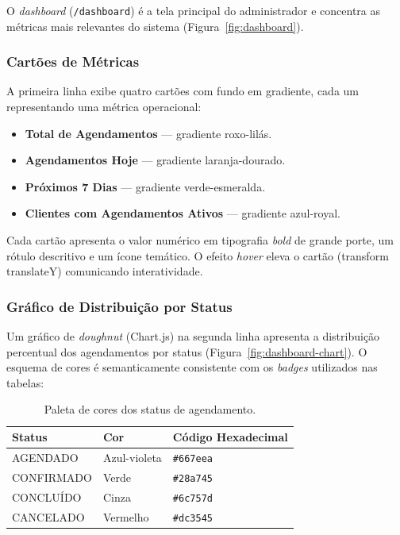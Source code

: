 O \textit{dashboard} (\texttt{/dashboard}) é a tela principal do administrador e
concentra as métricas mais relevantes do sistema
(Figura~\ref{fig:dashboard}).

\subsubsection{Cartões de Métricas}
A primeira linha exibe quatro cartões com fundo em gradiente, cada um
representando uma métrica operacional:

\begin{itemize}
  \item \textbf{Total de Agendamentos} — gradiente roxo-lilás.
  \item \textbf{Agendamentos Hoje} — gradiente laranja-dourado.
  \item \textbf{Próximos 7 Dias} — gradiente verde-esmeralda.
  \item \textbf{Clientes com Agendamentos Ativos} — gradiente azul-royal.
\end{itemize}

Cada cartão apresenta o valor numérico em tipografia \textit{bold} de grande
porte, um rótulo descritivo e um ícone temático. O efeito \textit{hover} eleva
o cartão (transform translateY) comunicando interatividade.

\subsubsection{Gráfico de Distribuição por Status}
Um gráfico de \textit{doughnut} (Chart.js) na segunda linha apresenta a
distribuição percentual dos agendamentos por status
(Figura~\ref{fig:dashboard-chart}). O esquema de cores é semanticamente
consistente com os \textit{badges} utilizados nas tabelas:

\begin{table}[H]
\centering
\begin{tabular}{lll}
\hline
\textbf{Status} & \textbf{Cor} & \textbf{Código Hexadecimal} \\ \hline
AGENDADO    & Azul-violeta & \texttt{\#667eea} \\
CONFIRMADO  & Verde        & \texttt{\#28a745} \\
CONCLUÍDO   & Cinza        & \texttt{\#6c757d} \\
CANCELADO   & Vermelho     & \texttt{\#dc3545} \\ \hline
\end{tabular}
\caption{Paleta de cores dos status de agendamento.}
\label{tab:cores-status}
\end{table}

